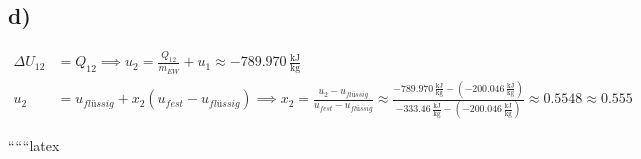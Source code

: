 

\subsection*{d)}
\begin{align*}
\Delta U_{12} &= Q_{12} \implies u_2 = \frac{Q_{12}}{m_{EW}} + u_1 \approx -789.970 \, \frac{\text{kJ}}{\text{kg}} \\
u_2 &= u_{flüssig} + x_2 (u_{fest} - u_{flüssig}) \implies x_2 = \frac{u_2 - u_{flüssig}}{u_{fest} - u_{flüssig}} \approx \frac{-789.970 \, \frac{\text{kJ}}{\text{kg}} - (-200.046 \, \frac{\text{kJ}}{\text{kg}})}{-333.46 \, \frac{\text{kJ}}{\text{kg}} - (-200.046 \, \frac{\text{kJ}}{\text{kg}})} \approx 0.5548 \approx 0.555
\end{align*}


``````latex